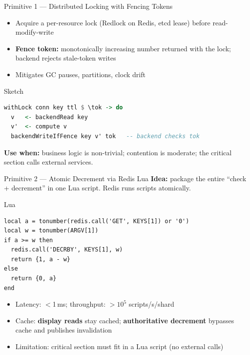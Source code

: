 \documentclass[aspectratio=169, 11pt]{beamer}
\begin{document}
\begin{frame}[fragile]{Primitive 1 --- Distributed Locking with Fencing Tokens}
\begin{itemize}
    \item Acquire a per-resource lock (Redlock on Redis, etcd lease) before read-modify-write
    \item \textbf{Fence token:} monotonically increasing number returned with the lock; backend rejects stale-token writes
    \item Mitigates GC pauses, partitions, clock drift
\end{itemize}
\begin{block}{Sketch}
\begin{lstlisting}[language=Haskell]
withLock conn key ttl $ \tok -> do
  v   <- backendRead key
  v'  <- compute v
  backendWriteIfFence key v' tok   -- backend checks tok
\end{lstlisting}
\end{block}
\textbf{Use when:} business logic is non-trivial; contention is moderate; the critical section calls external services.
\end{frame}

\begin{frame}[fragile]{Primitive 2 --- Atomic Decrement via Redis Lua}
\textbf{Idea:} package the entire ``check + decrement'' in one Lua script. Redis runs scripts atomically.
\begin{block}{Lua}
\begin{lstlisting}[language={[5.2]Lua}]
local a = tonumber(redis.call('GET', KEYS[1]) or '0')
local w = tonumber(ARGV[1])
if a >= w then
  redis.call('DECRBY', KEYS[1], w)
  return {1, a - w}
else
  return {0, a}
end
\end{lstlisting}
\end{block}
\begin{itemize}
    \item Latency: $<$1\,ms; throughput: $>10^5$ scripts/s/shard
    \item Cache: \textbf{display reads} stay cached; \textbf{authoritative decrement} bypasses cache and publishes invalidation
    \item Limitation: critical section must fit in a Lua script (no external calls)
\end{itemize}
\end{frame}
\end{document}

